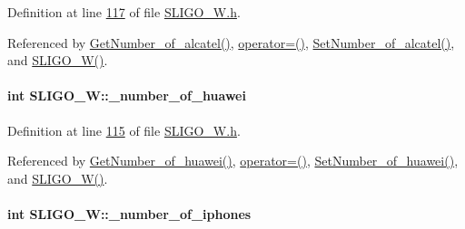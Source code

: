 Definition at line \hyperlink{_s_l_i_g_o___w_8h_source_l00117}{117} of file \hyperlink{_s_l_i_g_o___w_8h_source}{S\+L\+I\+G\+O\+\_\+\+W.\+h}.



Referenced by \hyperlink{_s_l_i_g_o___w_8cpp_source_l00073}{Get\+Number\+\_\+of\+\_\+alcatel()}, \hyperlink{_s_l_i_g_o___w_8h_source_l00075}{operator=()}, \hyperlink{_s_l_i_g_o___w_8cpp_source_l00069}{Set\+Number\+\_\+of\+\_\+alcatel()}, and \hyperlink{_s_l_i_g_o___w_8h_source_l00024}{S\+L\+I\+G\+O\+\_\+\+W()}.

\paragraph[{\texorpdfstring{\+\_\+number\+\_\+of\+\_\+huawei}{_number_of_huawei}}]{\setlength{\rightskip}{0pt plus 5cm}int S\+L\+I\+G\+O\+\_\+\+W\+::\+\_\+number\+\_\+of\+\_\+huawei\hspace{0.3cm}{\ttfamily [private]}}\hypertarget{class_s_l_i_g_o___w_af9ca2fb509b7b8ca9f1860ece827501f_af9ca2fb509b7b8ca9f1860ece827501f}{}\label{class_s_l_i_g_o___w_af9ca2fb509b7b8ca9f1860ece827501f_af9ca2fb509b7b8ca9f1860ece827501f}


Definition at line \hyperlink{_s_l_i_g_o___w_8h_source_l00115}{115} of file \hyperlink{_s_l_i_g_o___w_8h_source}{S\+L\+I\+G\+O\+\_\+\+W.\+h}.



Referenced by \hyperlink{_s_l_i_g_o___w_8cpp_source_l00089}{Get\+Number\+\_\+of\+\_\+huawei()}, \hyperlink{_s_l_i_g_o___w_8h_source_l00075}{operator=()}, \hyperlink{_s_l_i_g_o___w_8cpp_source_l00085}{Set\+Number\+\_\+of\+\_\+huawei()}, and \hyperlink{_s_l_i_g_o___w_8h_source_l00024}{S\+L\+I\+G\+O\+\_\+\+W()}.

\paragraph[{\texorpdfstring{\+\_\+number\+\_\+of\+\_\+iphones}{_number_of_iphones}}]{\setlength{\rightskip}{0pt plus 5cm}int S\+L\+I\+G\+O\+\_\+\+W\+::\+\_\+number\+\_\+of\+\_\+iphones\hspace{0.3cm}{\ttfamily [private]}}\hypertarget{class_s_l_i_g_o___w_aa958eed564796bb349d15bf2b2e3208d_aa958eed564796bb349d15bf2b2e3208d}{}\label{class_s_l_i_g_o___w_aa958eed564796bb349d15bf2b2e3208d_aa958eed564796bb349d15bf2b2e3208d}


